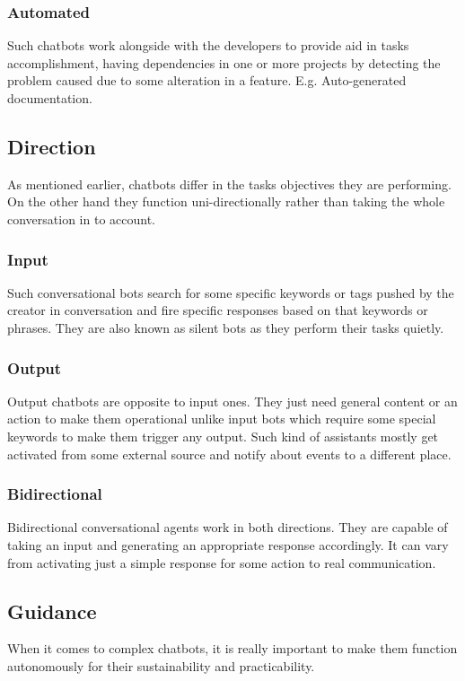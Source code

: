 \subsubsection*{Automated}
Such chatbots work alongside with the developers to provide aid in tasks accomplishment, having dependencies in one or more projects by detecting the problem caused due to some alteration in a feature. E.g. Auto-generated documentation.

\subsection{Direction}
As mentioned earlier, chatbots differ in the tasks objectives they are performing. On the other hand they function uni-directionally rather than taking the whole conversation in to account. \cite{frameworkforunderstandingchatbots}

\subsubsection*{Input}
Such conversational bots search for some specific keywords or tags pushed by the creator in conversation and fire specific responses based on that keywords or phrases. They are also known as silent bots as they perform their tasks quietly. \cite{frameworkforunderstandingchatbots}

\subsubsection*{Output}
Output chatbots are opposite to input ones. They just need general content or an action to make them operational unlike input bots which require some special keywords to make them trigger any output. Such kind of assistants mostly get activated from some external source and notify about events to a different place. \cite{frameworkforunderstandingchatbots}

\subsubsection*{Bidirectional}
Bidirectional conversational agents work in both directions. They are capable of taking an input and generating an appropriate response accordingly. It can vary from activating just a simple response for some action to real communication. \cite{frameworkforunderstandingchatbots}

\subsection{Guidance}
When it comes to complex chatbots, it is really important to make them function autonomously for their sustainability and practicability.

